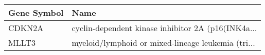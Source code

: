 \begin{tabular}{ll}
\toprule
Gene Symbol &                                               Name \\
\midrule
     CDKN2A & cyclin-dependent kinase inhibitor 2A (p16(INK4a... \\
      MLLT3 & myeloid/lymphoid or mixed-lineage leukemia (tri... \\
\bottomrule
\end{tabular}
